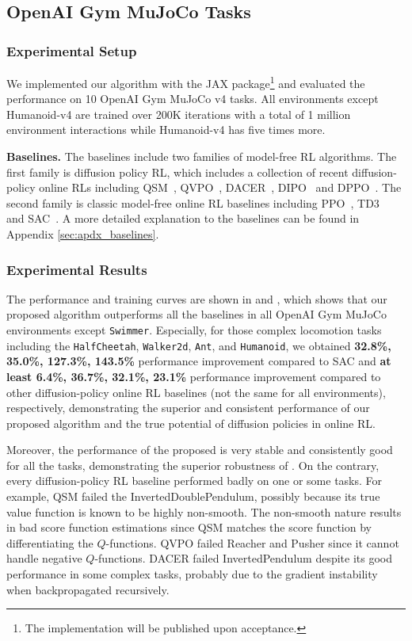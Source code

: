 \subsection{OpenAI Gym MuJoCo Tasks}
\subsubsection{Experimental Setup}
We implemented our algorithm with the JAX package\footnote{The implementation will be published upon acceptance.} and evaluated the performance on 10 OpenAI Gym MuJoCo v4 tasks. All environments except Humanoid-v4 are trained over 200K iterations with a total of 1 million environment interactions while Humanoid-v4 has five times more. 

\textbf{Baselines.} The baselines include two families of model-free RL algorithms. The first family is diffusion policy RL, which includes a collection of recent diffusion-policy online RLs including  QSM~\cite{psenka2023learning}, QVPO~\cite{ding2024diffusion}, DACER~\cite{wang2024diffusion}, DIPO~\cite{yang2023policy} and DPPO~\cite{ren2024diffusion}. The second family is classic model-free online RL baselines including PPO~\cite{schulman2017proximal}, TD3~\cite{fujimoto2018addressing} and SAC~\cite{haarnoja2018soft}. A more detailed explanation to the baselines can be found in Appendix \ref{sec:apdx_baselines}.


\subsubsection{Experimental Results}
The performance and training curves are shown in  and , which shows that our proposed algorithm outperforms all the baselines in all OpenAI Gym MuJoCo environments except \texttt{Swimmer}. Especially, for those complex locomotion tasks including the \texttt{HalfCheetah}, \texttt{Walker2d}, \texttt{Ant}, and \texttt{Humanoid}, we obtained \textbf{32.8\%, 35.0\%, 127.3\%, 143.5\%} performance improvement compared to SAC and \textbf{at least 6.4\%, 36.7\%, 32.1\%, 23.1\%} performance improvement compared to other diffusion-policy online RL baselines (not the same for all environments), respectively, demonstrating the superior and consistent performance of our proposed algorithm and the true potential of diffusion policies in online RL.

Moreover, the performance of the proposed \algabb is very stable and consistently good for all the tasks, demonstrating the superior robustness of \algabb. On the contrary, every diffusion-policy RL baseline performed badly on one or some tasks. For example, QSM failed the InvertedDoublePendulum, possibly because its true value function is known to be highly non-smooth. The non-smooth nature results in bad score function estimations since QSM matches the score function by differentiating the $Q$-functions. QVPO failed Reacher and Pusher since it cannot handle negative $Q$-functions. DACER failed InvertedPendulum despite its good performance in some complex tasks, probably due to the gradient instability when backpropagated recursively. 

